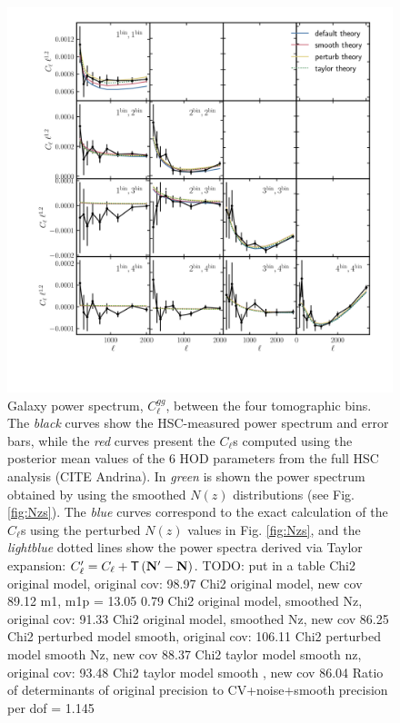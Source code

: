 \documentclass[a4paper,11pt]{article}
\newcommand{\vN}{\mathbf{N}}
\begin{document}
\begin{figure}[ht]
\centering  
\includegraphics[width=1.2\textwidth]{./Cls}
\caption{Galaxy power spectrum, $C_\ell^{gg}$, between the four
tomographic bins. The \textit{black} curves show the HSC-measured
power spectrum and error bars, while the
\textit{red} curves present the $C_\ell$s
computed using the posterior mean values of the 6 HOD parameters from the
full HSC analysis (CITE Andrina). In 
\textit{green} is shown the power
spectrum obtained by using the smoothed
$N(z)$ distributions (see Fig. \ref{fig:Nzs}). The \textit{blue}
curves correspond to the exact
calculation of the $C_\ell$s using the
perturbed $N(z)$ values in
Fig. \ref{fig:Nzs}, and the 
\textit{lightblue} dotted lines
show the power spectra derived via
Taylor expansion: $C_\ell' = C_\ell +
 {\sf T} \left(\vN' - {\vN} \right)$.
TODO: put in a table
Chi2 original model, original cov: 98.97
Chi2 original model, new cov  89.12
m1, m1p =  13.05 0.79
Chi2 original model, smoothed Nz, original cov: 91.33
Chi2 original model, smoothed Nz, new cov  86.25
Chi2 perturbed model smooth, original cov: 106.11
Chi2 perturbed model smooth Nz, new cov  88.37
Chi2 taylor model smooth nz, original cov: 93.48
Chi2 taylor model smooth , new cov  86.04
Ratio of determinants of original precision to CV+noise+smooth precision per dof =  1.145}
\label{fig:Cls}
\end{figure}
\end{document}
